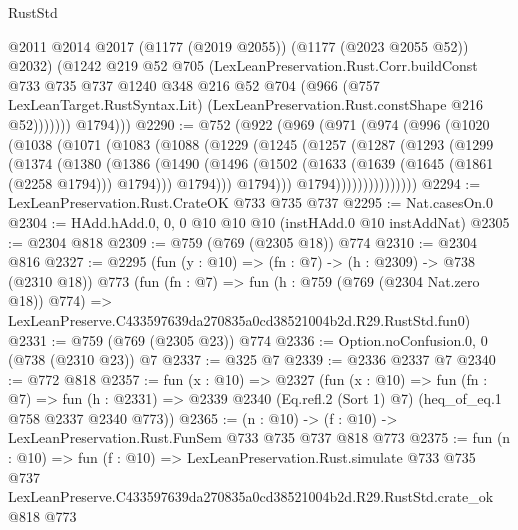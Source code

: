 \begin{lexlean}{RustStd}
\begin{coremodule}
                  @2011
                  @2014
                  @2017
                  (@1177 (@2019 @2055))
                  (@1177 (@2023 @2055 @52))
                  @2032)
                (@1242
                  @219
                  @52
                  @705
                  (LexLeanPreservation.Rust.Corr.buildConst
                    @733
                    @735
                    @737
                    @1240
                    @348
                    @216
                    @52
                    @704
                    (@966
                      (@757 LexLeanTarget.RustSyntax.Lit)
                      (LexLeanPreservation.Rust.constShape @216 @52)))))))
          @1794)))
@2290 := @752
    (@922
      (@969
        (@971
          (@974
            (@996
              (@1020
                (@1038
                  (@1071
                    (@1083
                      (@1088
                        (@1229
                          (@1245
                            (@1257
                              (@1287
                                (@1293
                                  (@1299
                                    (@1374
                                      (@1380
                                        (@1386
                                          (@1490
                                            (@1496
                                              (@1502
                                                (@1633 (@1639 (@1645 (@1861 (@2258 @1794))) @1794)))
                                              @1794)))
                                        @1794)))
                                  @1794)))))))))))))))
@2294 := LexLeanPreservation.Rust.CrateOK @733 @735 @737
@2295 := Nat.casesOn.{0}
@2304 := HAdd.hAdd.{0, 0, 0} @10 @10 @10 (instHAdd.{0} @10 instAddNat)
@2305 := @2304 @818
@2309 := @759 (@769 (@2305 @18)) @774
@2310 := @2304 @816
@2327 := @2295
    (fun (y : @10) => (fn : @7) -> (h : @2309) -> @738 (@2310 @18))
    @773
    (fun (fn : @7) =>
    fun (h : @759 (@769 (@2304 Nat.zero @18)) @774) =>
    LexLeanPreserve.C433597639da270835a0cd38521004b2d.R29.RustStd.fun0)
@2331 := @759 (@769 (@2305 @23)) @774
@2336 := Option.noConfusion.{0, 0} (@738 (@2310 @23)) @7
@2337 := @325 @7
@2339 := @2336 @2337 @7
@2340 := @772 @818
@2357 := fun (x : @10) =>
  @2327
    (fun (x : @10) =>
    fun (fn : @7) =>
    fun (h : @2331) => @2339 @2340 (Eq.refl.{2} (Sort 1) @7) (heq_of_eq.{1} @758 @2337 @2340 @773))
@2365 := (n : @10) -> (f : @10) -> LexLeanPreservation.Rust.FunSem @733 @735 @737 @818 @773
@2375 := fun (n : @10) =>
  fun (f : @10) =>
  LexLeanPreservation.Rust.simulate
    @733
    @735
    @737
    LexLeanPreserve.C433597639da270835a0cd38521004b2d.R29.RustStd.crate_ok
    @818
    @773
\end{coremodule}
\end{lexlean}
